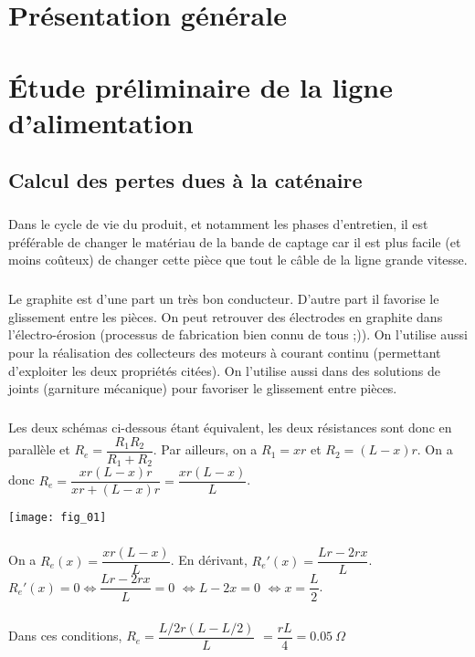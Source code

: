 \section*{Présentation générale}
\section{Étude préliminaire de la ligne d'alimentation}
\subsection{Calcul des pertes dues à la caténaire}
\subparagraph{}

Dans le cycle de vie du produit, et notamment les phases d'entretien, il est préférable de changer le matériau de la bande de captage car il est plus facile (et moins coûteux) de changer cette pièce que tout le câble de la ligne grande vitesse. 

\subparagraph{}
Le graphite est d'une part un très bon conducteur. D'autre part il favorise le glissement entre les pièces. 
On peut retrouver des électrodes en graphite dans l’électro-érosion (processus de fabrication bien connu de tous ;)). 
On l'utilise aussi pour la réalisation des collecteurs des moteurs à courant continu (permettant d'exploiter les deux propriétés citées). On l'utilise aussi dans des solutions de joints (garniture mécanique) pour favoriser le glissement entre pièces.


\subparagraph{}
Les deux schémas ci-dessous étant équivalent, les deux résistances sont donc en parallèle et $R_e = \dfrac{R_1R_2}{R_1+R_2}$. 
Par ailleurs, on  a $R_1 = xr$ et $R_2 = \left(L-x\right)r$. On a donc  $R_e = \dfrac{xr\left(L-x\right)r}{xr+\left(L-x\right)r}$$= \dfrac{xr\left(L-x\right)}{L}$. 

\begin{center}
\texttt{[image: fig\_01]}
\end{center}


\subparagraph{}
On a $R_e(x)= \dfrac{xr\left(L-x\right)}{L}$. En dérivant, 
$R_e'(x)= \dfrac{Lr-2rx}{L}$.$R_e'(x)=0 \Leftrightarrow \dfrac{Lr-2rx}{L} = 0 $ 
$ \Leftrightarrow L-2x = 0 $ $ \Leftrightarrow x = \dfrac{L}{2}$.

\subparagraph{}
Dans ces conditions, $R_e = \dfrac{L/2r\left(L-L/2\right)}{L}$ $= \dfrac{rL}{4}=\SI{0,05}{\Omega}$


